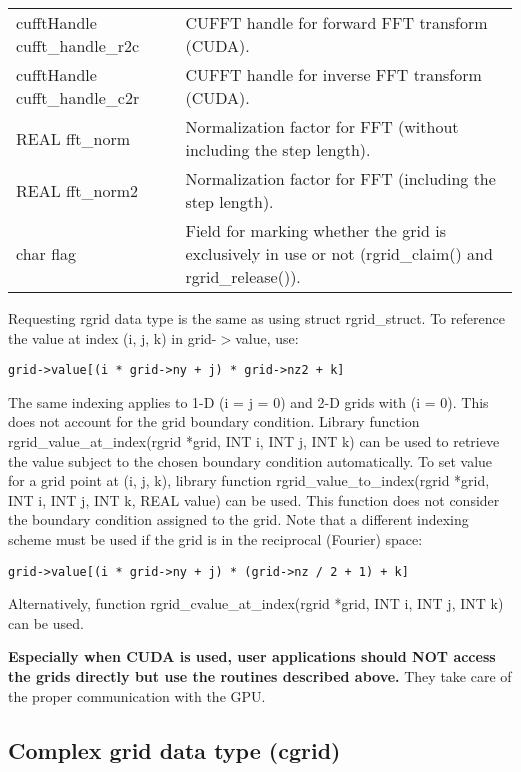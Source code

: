 \documentclass[12pt,letterpaper]{report}
\begin{document}
\begin{longtable}{p{} p{}}
cufftHandle cufft\_handle\_r2c & CUFFT handle for forward FFT transform (CUDA).\\
cufftHandle cufft\_handle\_c2r & CUFFT handle for inverse FFT transform (CUDA).\\
REAL fft\_norm & Normalization factor for FFT (without including the step length).\\
REAL fft\_norm2 & Normalization factor for FFT (including the step length).\\
char flag & Field for marking whether the grid is exclusively in use or not (rgrid\_claim() and rgrid\_release()).\\
\end{longtable}

\noindent
Requesting rgrid data type is the same as using struct rgrid\_struct. To reference the value at index (i, j, k) in grid-$>$value, use:
\begin{verbatim}
grid->value[(i * grid->ny + j) * grid->nz2 + k]
\end{verbatim}
The same indexing applies to 1-D (i = j = 0) and 2-D grids with (i = 0). This does not account for the grid boundary condition. Library function rgrid\_value\_at\_index(rgrid *grid, INT i, INT j, INT k) can be used to retrieve the value subject to the chosen boundary condition automatically. To set value for a grid point at (i, j, k), library function rgrid\_value\_to\_index(rgrid *grid, INT i, INT j, INT k, REAL value) can be used. This function does not consider the boundary condition assigned to the grid. Note that a different indexing scheme must be used if the grid is in the reciprocal (Fourier) space:
\begin{verbatim}
grid->value[(i * grid->ny + j) * (grid->nz / 2 + 1) + k]
\end{verbatim}
Alternatively, function rgrid\_cvalue\_at\_index(rgrid *grid, INT i, INT j, INT k) can be used.

\noindent
\textbf{Especially when CUDA is used, user applications should NOT access the grids directly but use the routines described above.} They take care of the proper communication with the GPU.

\subsection{Complex grid data type (cgrid)}
\end{document}
